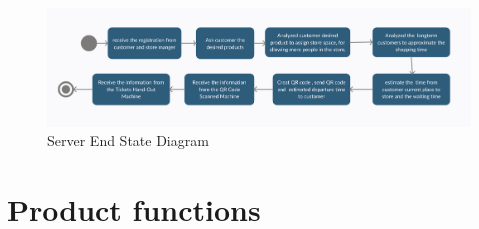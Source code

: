 \documentclass[a4paper,12pt]{book}
\begin{document}
\begin{figure}[H] 
	\includegraphics[scale=0.3]{State_diagram3.png}
	\caption{Server End State Diagram}
	\centering
	\label{State Diagram 3}
\end{figure}


\newpage


\section{Product functions}
\end{document}

